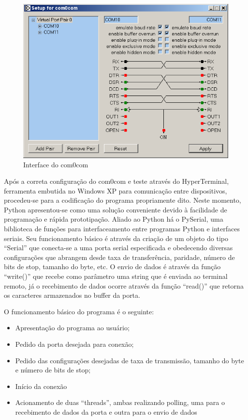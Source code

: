 \documentclass[brazil,times,12pt]{abnt}
\begin{document}
	\begin{figure}[htp]
	\begin{center}
  		\includegraphics[width=120mm]{imagens/com0com-setup.PNG}
  		\caption[Interface do com0com]{Interface do com0com}
  	\label{fig:com0com}
	\end{center}
	\end{figure}
	
	Após a correta configuração do com0com e teste através do HyperTerminal,
	ferramenta embutida no Windows XP para comunicação entre dispositivos, 
	procedeu-se para a codificação do programa propriamente dito. Neste momento,
	Python apresentou-se como uma solução conveniente devido à facilidade de
	programação e rápida prototipação. Aliado ao Python há o PySerial, uma
	biblioteca de funções para interfaceamento entre programas Python e interfaces
	seriais. Seu funcionamento básico é através da criação de um objeto do tipo
	``Serial'' que conecta-se a uma porta serial especificada e obedecendo diversas
	configurações que abrangem desde taxa de transferência, paridade, número de
	bits de stop, tamanho do byte, etc. O envio de dados é através da função
	``write()'' que recebe como parâmetro uma string que é enviada ao terminal
	remoto, já o recebimento de dados ocorre através da função ``read()'' que
	retorna os caracteres armazenados no buffer da porta.
	
	O funcionamento básico do programa é o seguinte: 
	\begin{itemize}
  		\item Apresentação do programa ao usuário;
  		\item Pedido da porta desejada para conexão;
  		\item Pedido das configurações desejadas de taxa de transmissão, tamanho do
  		byte e número de bits de stop;
  		\item Início da conexão
  		\item Acionamento de duas ``threads'', ambas realizando polling, uma para o
  		recebimento de dados da porta e outra para o envio de dados
	\end{itemize}
\end{document}
